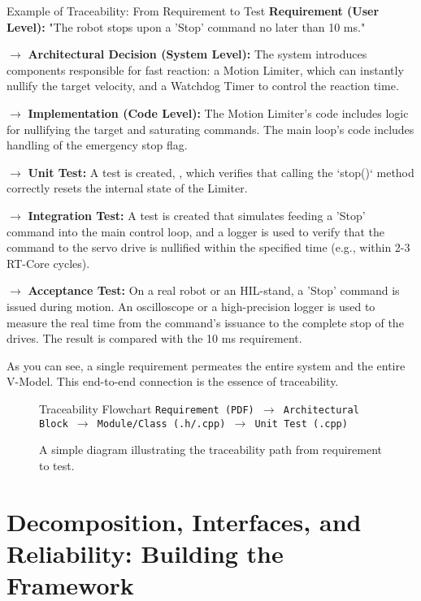 \begin{tipbox}{Example of Traceability: From Requirement to Test}
\textbf{Requirement (User Level):} "The robot stops upon a 'Stop' command no later than 10 ms."

$\rightarrow$ \textbf{Architectural Decision (System Level):} The system introduces components responsible for fast reaction: a Motion Limiter, which can instantly nullify the target velocity, and a Watchdog Timer to control the reaction time.

$\rightarrow$ \textbf{Implementation (Code Level):} The Motion Limiter's code includes logic for nullifying the target and saturating commands. The main loop's code includes handling of the emergency stop flag.

$\rightarrow$ \textbf{Unit Test:} A test is created, , which verifies that calling the `stop()` method correctly resets the internal state of the Limiter.

$\rightarrow$ \textbf{Integration Test:} A test is created that simulates feeding a 'Stop' command into the main control loop, and a logger is used to verify that the command to the servo drive is nullified within the specified time (e.g., within 2-3 RT-Core cycles).

$\rightarrow$ \textbf{Acceptance Test:} On a real robot or an HIL-stand, a 'Stop' command is issued during motion. An oscilloscope or a high-precision logger is used to measure the real time from the command's issuance to the complete stop of the drives. The result is compared with the 10 ms requirement.
\end{tipbox}

As you can see, a single requirement permeates the entire system and the entire V-Model. This end-to-end connection is the essence of traceability.

\begin{figure}[h!]
    \centering
    \begin{infobox}{Traceability Flowchart}
        \texttt{Requirement (PDF) $\rightarrow$ Architectural Block $\rightarrow$ Module/Class (.h/.cpp) $\rightarrow$ Unit Test (.cpp)}
    \end{infobox}
    \caption{A simple diagram illustrating the traceability path from requirement to test.}
    \label{fig:traceability_flow}
\end{figure}


\section{Decomposition, Interfaces, and Reliability: Building the Framework}

